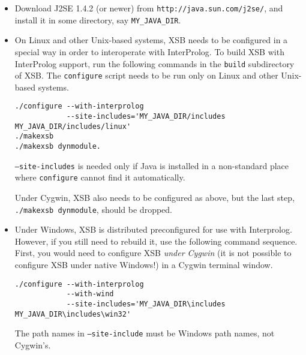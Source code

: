 \begin{itemize}
\item Download J2SE 1.4.2 (or newer) from
  {\tt http://java.sun.com/j2se/},
and install it in some directory, say {\tt MY\_JAVA\_DIR}.
\item On Linux and other Unix-based systems,
  XSB needs to be configured in a special way
in order to interoperate with InterProlog. To build XSB with
InterProlog support, run the following commands in the {\tt build}
subdirectory of XSB.
The {\tt configure} script needs to be run only on Linux and
other Unix-based systems.
\begin{verbatim}
./configure --with-interprolog
            --site-includes='MY_JAVA_DIR/includes MY_JAVA_DIR/includes/linux'
./makexsb
./makexsb dynmodule.
\end{verbatim}
{\tt --site-includes} is needed only if Java is installed in a non-standard
place where {\tt configure} cannot find it automatically.

Under Cygwin, XSB also needs to be configured as above, but the last step,
{\tt ./makexsb dynmodule}, should be dropped.

\item Under Windows, XSB is distributed preconfigured for use with
  Interprolog. However, if you still need to rebuild it, use the following
  command sequence. First, you would need to configure XSB \emph{under
    Cygwin} (it is not possible to configure XSB under native Windows!) in a
  Cygwin terminal window.  
\begin{verbatim}
./configure --with-interprolog
            --with-wind
            --site-includes='MY_JAVA_DIR\includes MY_JAVA_DIR\includes\win32'
\end{verbatim}
  The path names in {\tt --site-include} must be Windows path names, not
  Cygwin's.


\end{itemize}
